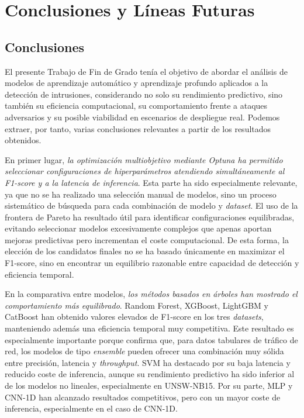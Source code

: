 \chapter{Conclusiones y Líneas Futuras}

\section{Conclusiones}

El presente Trabajo de Fin de Grado tenía el objetivo de abordar el análisis de modelos de aprendizaje automático y aprendizaje profundo aplicados a la detección de intrusiones, considerando no solo su rendimiento predictivo, sino también su eficiencia computacional, su comportamiento frente a ataques adversarios y su posible viabilidad en escenarios de despliegue real. Podemos extraer, por tanto, varias conclusiones relevantes a partir de los resultados obtenidos.

En primer lugar, \textit{la optimización multiobjetivo mediante Optuna ha permitido seleccionar configuraciones de hiperparámetros atendiendo simultáneamente al F1-score y a la latencia de inferencia}. Esta parte ha sido especialmente relevante, ya que no se ha realizado una selección manual de modelos, sino un proceso sistemático de búsqueda para cada combinación de modelo y \textit{dataset}. El uso de la frontera de Pareto ha resultado útil para identificar configuraciones equilibradas, evitando seleccionar modelos excesivamente complejos que apenas aportan mejoras predictivas pero incrementan el coste computacional. De esta forma, la elección de los candidatos finales no se ha basado únicamente en maximizar el F1-score, sino en encontrar un equilibrio razonable entre capacidad de detección y eficiencia temporal.

En la comparativa entre modelos, \textit{los métodos basados en árboles han mostrado el comportamiento más equilibrado}. Random Forest, XGBoost, LightGBM y CatBoost han obtenido valores elevados de F1-score en los tres \textit{datasets}, manteniendo además una eficiencia temporal muy competitiva. Este resultado es especialmente importante porque confirma que, para datos tabulares de tráfico de red, los modelos de tipo \textit{ensemble} pueden ofrecer una combinación muy sólida entre precisión, latencia y \textit{throughput}. SVM ha destacado por su baja latencia y reducido coste de inferencia, aunque su rendimiento predictivo ha sido inferior al de los modelos no lineales, especialmente en UNSW-NB15. Por su parte, MLP y CNN-1D han alcanzado resultados competitivos, pero con un mayor coste de inferencia, especialmente en el caso de CNN-1D.

